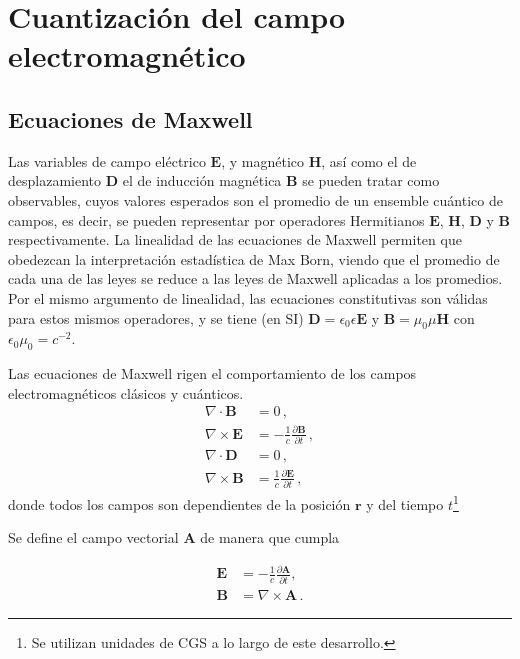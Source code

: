 \chapter{Cuantizaci\'on del campo electromagn\'etico}

\section{Ecuaciones de Maxwell}

Las variables de campo eléctrico $\mathbf{E}$, y magnético $\mathbf{H}$, así como el de desplazamiento $\mathbf{D}$ el de inducción magnética $\mathbf{B}$ se pueden tratar como observables, cuyos valores esperados son el promedio de un ensemble cuántico de campos, es decir, se pueden representar por operadores Hermitianos $\mathbf{E}$, $\mathbf{H}$, $\mathbf{D}$ y $\mathbf{B}$ respectivamente. La linealidad de las ecuaciones de Maxwell permiten que obedezcan la interpretación estadística de Max Born, viendo que el promedio de cada una de las leyes se reduce a las leyes de Maxwell aplicadas a los promedios. Por el mismo argumento de linealidad, las ecuaciones constitutivas son válidas para estos mismos operadores, y se tiene (en SI) $\mathbf{D} = \epsilon_0 \epsilon \mathbf{E}$ y $\mathbf{B} = \mu_0 \mu \mathbf{H}$ con $\epsilon_0 \mu_0 = c^{-2}$.

Las ecuaciones de Maxwell rigen el comportamiento de los campos electromagnéticos clásicos y cuánticos.
\begin{align}
  \nabla \cdot \mathbf{B}  & = 0 \,,                                              \label{EM.1}           \\
  \nabla \times \mathbf{E} & = - \frac{1}{c} \frac{\partial \mathbf{B}}{\partial t}\,,      \label{EM.2} \\
  \nabla \cdot \mathbf{D}  & = 0 \,,                                        \label{EM.3}                 \\
  \nabla \times \mathbf{B} & = \frac{1}{c}
  \frac{\partial \mathbf{E}}{\partial t}\,, \label{EM.4}
\end{align}
donde todos los campos son dependientes de la posición $\mathbf{r}$ y del tiempo $t$\footnote{Se utilizan unidades de CGS a lo largo de este desarrollo.}



Se define el campo vectorial $\mathbf{A}$ de manera que cumpla

\begin{align}
  \mathbf{E} & = -\frac{1}{c}\frac{\partial \mathbf{A}}{\partial t}, \label{EM.5} \\
  \mathbf{B} & = \nabla \times \mathbf{A}\,.\label{EM.6}
\end{align}

